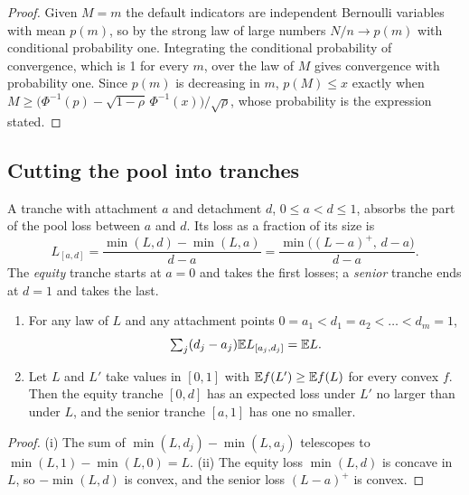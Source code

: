 \begin{chapterrefs}
\begin{proof}
Given $M=m$ the default indicators are independent Bernoulli variables with mean $p(m)$, so by the
strong law of large numbers $N/n\to p(m)$ with conditional probability one. Integrating the
conditional probability of convergence, which is 1 for every $m$, over the law of $M$ gives
convergence with probability one. Since $p(m)$ is decreasing in $m$, $p(M)\le x$ exactly when
$M\ge\bigl(\Phi^{-1}(p)-\sqrt{1-\rho}\,\Phi^{-1}(x)\bigr)/\sqrt\rho$, whose probability is the expression
stated.
\end{proof}

\subsection{Cutting the pool into tranches}

A tranche with attachment $a$ and detachment $d$, $0\le a<d\le1$, absorbs the part of the pool loss
between $a$ and $d$. Its loss as a fraction of its size is
\[
  L_{[a,d]}=\frac{\min(L,d)-\min(L,a)}{d-a}=\frac{\min\bigl((L-a)^+,\,d-a\bigr)}{d-a}.
\]
The \emph{equity} tranche starts at $a=0$ and takes the first losses; a \emph{senior} tranche ends at
$d=1$ and takes the last.

\begin{proposition}\label{prop6:tranche}
\begin{enumerate}[label=(\roman*)]
  \item For any law of $L$ and any attachment points $0=a_1<d_1=a_2<\dots<d_m=1$,
  \[\textstyle\sum_j(d_j-a_j)\mathbb{E} L_{[a_j,d_j]}=\mathbb{E} L.\]
  \item Let $L$ and $L'$ take values in $[0,1]$ with $\mathbb{E} f(L')\ge\mathbb{E} f(L)$ for every convex $f$. Then
  the equity tranche $[0,d]$ has an expected loss under $L'$ no larger than under $L$, and the senior
  tranche $[a,1]$ has one no smaller.
\end{enumerate}
\end{proposition}

\begin{proof}
(i) The sum of $\min(L,d_j)-\min(L,a_j)$ telescopes to $\min(L,1)-\min(L,0)=L$. (ii) The equity loss
$\min(L,d)$ is concave in $L$, so $-\min(L,d)$ is convex, and the senior loss $(L-a)^+$ is convex.
\end{proof}


\end{chapterrefs}
